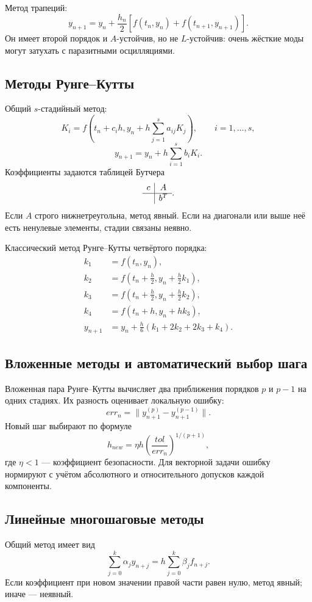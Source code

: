 Метод трапеций:
\[
    y_{n+1}=y_n+\frac{h_n}{2}
    \left[f(t_n,y_n)+f(t_{n+1},y_{n+1})\right].
\]
Он имеет второй порядок и $A$-устойчив, но не $L$-устойчив: очень жёсткие моды
могут затухать с паразитными осцилляциями.

\subsection{Методы Рунге--Кутты}

Общий $s$-стадийный метод:
\[
    K_i=f\left(t_n+c_i h,
    y_n+h\sum_{j=1}^{s}a_{ij}K_j\right),
    \qquad i=1,\ldots,s,
\]
\[
    y_{n+1}=y_n+h\sum_{i=1}^{s}b_iK_i.
\]
Коэффициенты задаются таблицей Бутчера
\[
\begin{array}{c|c}
 c&A\\ \hline
 &b^T
\end{array}.
\]
Если $A$ строго нижнетреугольна, метод явный. Если на диагонали или выше неё есть
ненулевые элементы, стадии связаны неявно.

Классический метод Рунге--Кутты четвёртого порядка:
\[
\begin{aligned}
k_1&=f(t_n,y_n),\\
k_2&=f\left(t_n+\frac h2,y_n+\frac h2k_1\right),\\
k_3&=f\left(t_n+\frac h2,y_n+\frac h2k_2\right),\\
k_4&=f(t_n+h,y_n+hk_3),\\
y_{n+1}&=y_n+\frac h6(k_1+2k_2+2k_3+k_4).
\end{aligned}
\]

\subsection{Вложенные методы и автоматический выбор шага}

Вложенная пара Рунге--Кутты вычисляет два приближения порядков $p$ и $p-1$ на
одних стадиях. Их разность оценивает локальную ошибку:
\[
    err_n=\|y_{n+1}^{(p)}-y_{n+1}^{(p-1)}\|.
\]
Новый шаг выбирают по формуле
\[
    h_{new}=\eta h
    \left(\frac{tol}{err_n}\right)^{1/(p+1)},
\]
где $\eta<1$ --- коэффициент безопасности. Для векторной задачи ошибку
нормируют с учётом абсолютного и относительного допусков каждой компоненты.

\subsection{Линейные многошаговые методы}

Общий метод имеет вид
\[
    \sum_{j=0}^{k}\alpha_j y_{n+j}
    =h\sum_{j=0}^{k}\beta_j f_{n+j}.
\]
Если коэффициент при новом значении правой части равен нулю, метод явный;
иначе --- неявный.

